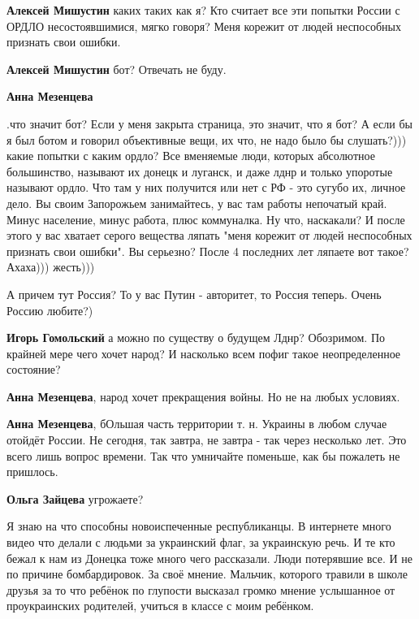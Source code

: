 \begin{itemize}
\begin{itemize}
\textbf{Алексей Мишустин} каких таких как я? Кто считает все эти попытки России с ОРДЛО несостоявшимися, мягко говоря?
Меня корежит от людей неспособных признать свои ошибки.

\textbf{Алексей Мишустин} бот? Отвечать не буду.

\textbf{Анна Мезенцева}

.что значит бот? Если у меня закрыта страница, это значит, что я бот? А если бы я
был ботом и говорил объективные вещи, их что, не надо было бы слушать?))) какие
попытки с каким ордло? Все вменяемые люди, которых абсолютное
большинство, называют их донецк и луганск, и даже лднр и только упоротые называют
ордло. Что там у них получится или нет с РФ - это сугубо их, личное дело. Вы своим
Запорожьем занимайтесь, у вас там работы непочатый край. Минус население, минус
работа, плюс коммуналка. Ну что, наскакали? И после этого у вас хватает серого
вещества ляпать "меня корежит от людей неспособных признать свои ошибки". Вы
серьезно? После 4 последних лет ляпаете вот такое? Ахаха))) жесть)))


А причем тут Россия? То у вас Путин - авторитет, то Россия теперь. Очень Россию
любите?)

\textbf{Игорь Гомольский} а можно по существу о будущем Лднр? Обозримом. По крайней мере чего хочет народ? И насколько всем пофиг такое неопределенное состояние?

\textbf{Анна Мезенцева}, народ хочет прекращения войны. Но не на любых условиях.

\textbf{Анна Мезенцева}, бОльшая часть территории т. н. Украины в любом случае отойдёт России. Не сегодня, так завтра, не завтра - так через несколько лет. Это всего лишь вопрос времени. Так что умничайте поменьше, как бы пожалеть не пришлось.

\textbf{Ольга Зайцева} угрожаете? 

Я знаю на что способны новоиспеченные республиканцы. В интернете много видео
что делали с людьми за украинский флаг, за украинскую речь. И те кто бежал к
нам из Донецка тоже много чего рассказали. Люди потерявшие все. И не по причине
бомбардировок. За своё мнение. Мальчик, которого травили в школе друзья за то
что ребёнок по глупости высказал громко мнение услышанное от проукраинских
родителей, учиться в классе с моим ребёнком.


\end{itemize}
\end{itemize}
